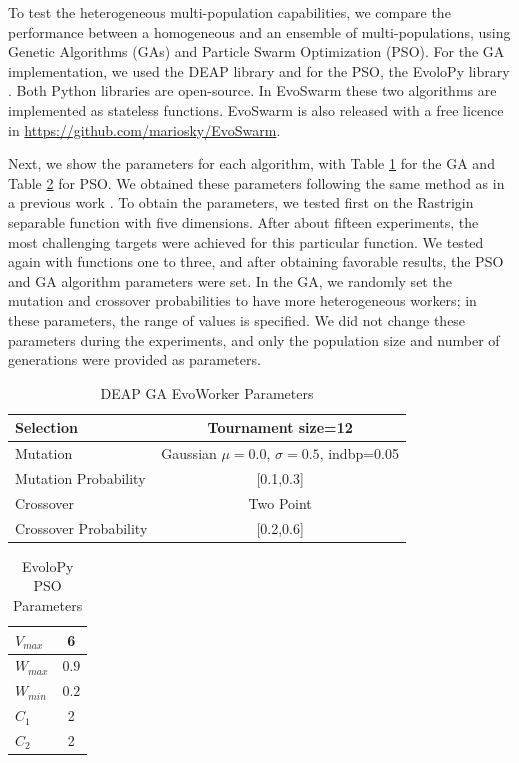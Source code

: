 \documentclass[review]{elsarticle}
\begin{document}
To test the heterogeneous multi-population capabilities,  we compare the
performance between a homogeneous and an ensemble of multi-populations, using
Genetic Algorithms (GAs) and Particle Swarm Optimization (PSO). For the GA
implementation, we used the DEAP library \cite{fortin2012deap} and for the PSO,
the EvoloPy library \cite{faris2016evolopy}. Both Python libraries are
open-source. In EvoSwarm these two algorithms are implemented as stateless
functions. EvoSwarm is also released with a free licence in \url{https://github.com/mariosky/EvoSwarm}.


Next, we show the parameters for each algorithm, with Table \ref{tab:GAparams} for
the GA and Table \ref{tab:PSOparams} for PSO. We obtained these parameters
following the same method as in a previous work \cite{garcia2017benchmarking}.
To obtain the parameters, we tested first on the Rastrigin separable function
with five dimensions. After about fifteen experiments, the most challenging
targets were achieved for this particular function. We tested again with
functions one to three, and after obtaining favorable results, the PSO and GA
algorithm parameters were set. In the GA, we randomly set the mutation and
crossover probabilities to have more heterogeneous workers; in these parameters,
the range of values is specified. We did not change these parameters during the
experiments, and only the population size and number of generations were
provided as parameters. 

\begin{table}
  \small
  \caption{ DEAP GA EvoWorker Parameters }
  \label{tab:GAparams} 
  \centering
  \small
  \begin{tabular}{|l|c|}
    \hline
    Selection & Tournament size=12                            \\ \hline
    Mutation & Gaussian $\mu=0.0$, $\sigma=0.5$, indbp=0.05   \\ \hline
    Mutation Probability & [0.1,0.3]                          \\ \hline
    Crossover & Two Point                                     \\ \hline
    Crossover Probability  & [0.2,0.6]                          \\ \hline
  \end{tabular}
\end{table}

\begin{table}
  \small
  \caption{ EvoloPy PSO Parameters }
  \label{tab:PSOparams} 
  \centering
  \small
  \begin{tabular}{|l|c|}
    \hline
    $V_{max}$ & 6 \\ \hline
    $W_{max}$ & $0.9$ \\ \hline
    $W_{min}$ & $0.2$ \\ \hline
    $C_1$ & 2 \\ \hline
    $C_2$ & 2 \\ \hline
  \end{tabular}
\end{table}
\end{document}

